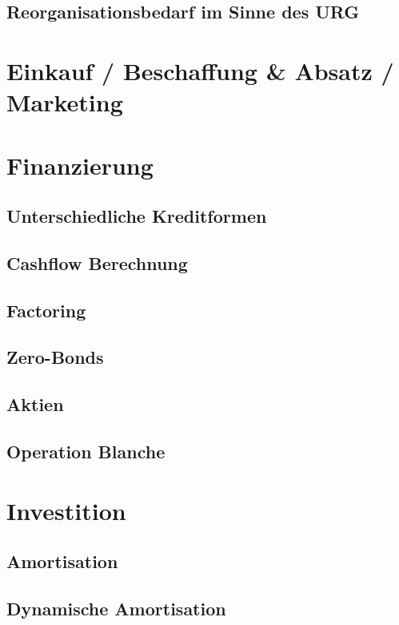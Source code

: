 \documentclass[11pt]{scrartcl}
\begin{document}
\subsection[]{Reorganisationsbedarf im Sinne des URG}
\section{Einkauf / Beschaffung \& Absatz / Marketing}
\section{Finanzierung}
\subsection[]{Unterschiedliche Kreditformen}
\subsection[]{Cashflow Berechnung}
\subsection[]{Factoring}
\subsection[]{Zero-Bonds}
\subsection[]{Aktien}
\subsection[]{Operation Blanche}
\section{Investition}
\subsection[]{Amortisation}
\subsection[]{Dynamische Amortisation}
\end{document}
